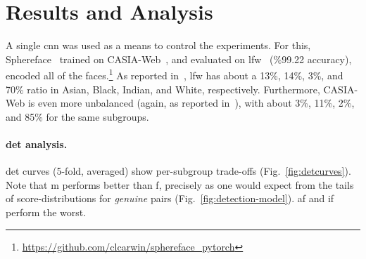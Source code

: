 
\section{Results and Analysis}
A single \gls{cnn} was used as a means to control the experiments. For this, Sphereface~\cite{liu2017sphereface} trained on CASIA-Web~\cite{yi2014learning}, and evaluated on \gls{lfw}~\cite{LFWTech} (\%99.22 accuracy), encoded all of the faces.\footnote{\href{$https://github.com/clcarwin/sphereface\_pytorch$}{https://github.com/clcarwin/sphereface\_pytorch}} As reported in~\cite{wang2019racial}, \gls{lfw} has about a 13\%, 14\%, 3\%, and 70\% ratio in Asian, Black, Indian, and White, respectively. Furthermore, CASIA-Web is even more unbalanced (again, as reported in~\cite{wang2019racial}), with about  3\%, 11\%, 2\%, and 85\% for the same subgroups.
\noindent\paragraph{\gls{det} analysis.}
\gls{det} curves (5-fold, averaged) show per-subgroup trade-offs (Fig.~\ref{fig:detcurves}). Note that \gls{m} performs better than \gls{f}, precisely as one would expect from the tails of score-distributions for \emph{genuine} pairs (Fig.~\ref{fig:detection-model}). \Gls{af} and \gls{if} perform the worst.



